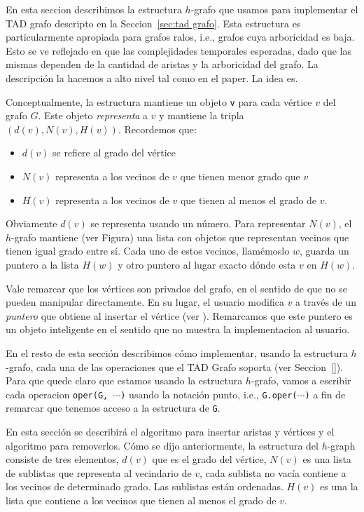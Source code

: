\documentclass[a4paper,12pt]{article}
\begin{document}
En esta seccion describimos la estructura $h$-grafo que usamos para implementar el TAD grafo descripto en la Seccion~\ref{sec:tad grafo}.  Esta estructura es particularmente apropiada para grafos ralos, i.e., grafos cuya arboricidad es baja.  Esto se ve reflejado en que las complejidades temporales esperadas, dado que las mismas dependen de la cantidad de aristas y la arboricidad del grafo.  La descripción la hacemos a alto nivel tal como en el paper.  La idea es.


Conceptualmente, la estructura mantiene un objeto \texttt{v} para cada vértice $v$ del grafo $G$.  Este objeto \emph{representa} a $v$ y mantiene la tripla $(d(v), N(v), H(v))$.  Recordemos que:   
\begin{itemize}
\item $d(v)$ se refiere al grado del vértice
\item $N(v)$ representa a los vecinos de $v$ que tienen menor grado que $v$
\item $H(v)$ representa a los vecinos de $v$ que tienen al menos el grado de $v$.
\end{itemize}

 Obviamente $d(v)$ se representa usando un número. Para representar $N(v)$, el $h$-grafo mantiene (ver Figura) una lista con objetos que representan vecinos que tienen igual grado entre sí. Cada uno de estos vecinos,   llamémoslo $w$,  guarda un puntero a la lista $H(w)$ y otro puntero al lugar exacto dónde esta $v$ en $H(w)$.

Vale remarcar que los vértices son privados del grafo, en el sentido de que no se pueden manipular directamente.  En su lugar, el usuario modifica $v$ a través de un \emph{puntero} que obtiene al insertar el vértice (ver ).  Remarcamos que este puntero es un objeto inteligente en el sentido que no muestra la implementacion al usuario.

En el resto de esta sección describimos cómo implementar, usando la estructura $h$-grafo, cada una de las operaciones que el TAD Grafo soporta (ver Seccion~\ref{}).  Para que quede claro que estamos usando la estructura $h$-grafo, vamos a escribir cada operacion \texttt{oper(G, $\cdots$)} usando la notación punto, i.e., \texttt{G.oper($\cdots$)} a fin de remarcar que tenemos acceso a la estructura de \texttt{G}.

En esta sección se describirá el algoritmo para insertar aristas y vértices y el algoritmo para removerlos.
Cómo se dijo anteriormente, la estructura del $h$-graph consiste de tres elementos, $d(v)$ que es el grado del vértice, $N(v)$ es una lista de sublistas que representa al vecindario de $v$, cada sublista no vacía contiene a los vecinos de determinado grado. Las sublistas están ordenadas. $H(v)$ es una la lista que contiene a los vecinos que tienen al menos el grado de $v$.
\end{document}
